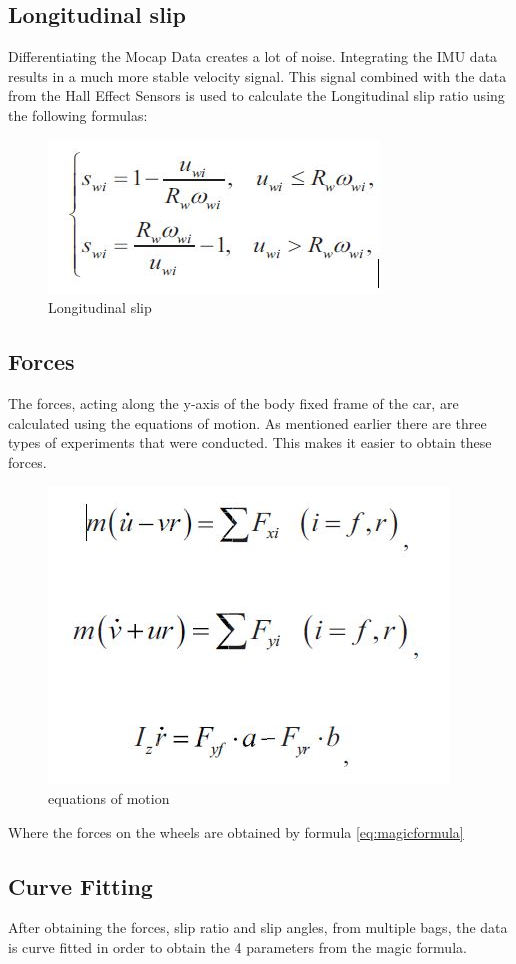  
\subsection{Longitudinal slip}
Differentiating the Mocap Data creates a lot of noise. Integrating the IMU data results in a much more stable velocity signal. This signal combined with the data from the Hall Effect Sensors is used to calculate the Longitudinal slip ratio using the following formulas:
\begin{figure}
	\centering
	\includegraphics[scale=0.4]{figure/Longitudonalslip}
	\caption{Longitudinal slip}
	\label{fig:brickwall}
	\end{figure}

\subsection{Forces}
The forces, acting along the y-axis of the body fixed frame of the car, are calculated using the equations of motion. As mentioned earlier there are three types of experiments that were conducted. This makes it easier to obtain these forces.

\begin{figure}
	\centering
	\includegraphics[scale=0.4]{figure/Equationsofmotion}
	\caption{equations of motion}
	\label{fig:brickwall}
	\end{figure}

Where the forces on the wheels are obtained by formula \ref{eq:magicformula}

\subsection{Curve Fitting}
After obtaining the forces, slip ratio and slip angles, from multiple bags, the data is curve fitted in order to obtain the 4 parameters from the magic formula.
 

